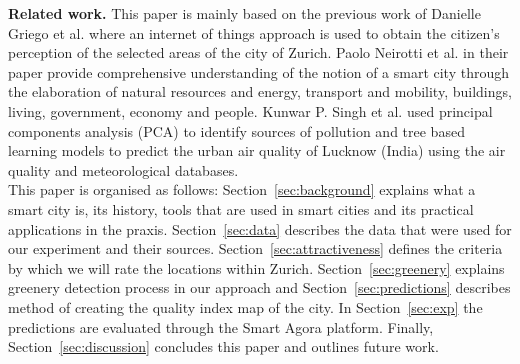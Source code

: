 \documentclass[letterpaper]{article}
\newcommand{\mypar}[1]{{\bf #1.}}
\begin{document}
\mypar{Related work} This paper is mainly based on the previous work of Danielle Griego et al. \cite{smartCities}
where an internet of things approach is used to obtain the citizen's perception of the selected areas of the city of Zurich.
Paolo Neirotti et al. \cite{smartCities2} in their paper provide comprehensive understanding of the notion of a smart city
through the elaboration of natural resources and energy, transport and mobility, buildings, living, government, economy
and people. Kunwar P. Singh et al. \cite{pollution} used principal components analysis (PCA) to identify sources
of pollution and tree based learning models to predict the urban air quality of Lucknow (India) using the air quality
and meteorological databases.
\\
\indent This paper is organised as follows: Section~\ref{sec:background} explains what a smart city is, its history, tools that are used
in smart cities and its practical applications in the praxis. Section~\ref{sec:data} describes the data that were used for our
experiment and their sources. Section~\ref{sec:attractiveness} defines the criteria by which we will rate the locations within Zurich.
Section~\ref{sec:greenery} explains greenery detection process in our approach and Section~\ref{sec:predictions} describes method of creating the quality index
map of the city. In Section~\ref{sec:exp} the predictions are evaluated through the Smart Agora platform. Finally, Section~\ref{sec:discussion} concludes this
paper and outlines future work.
\end{document}
